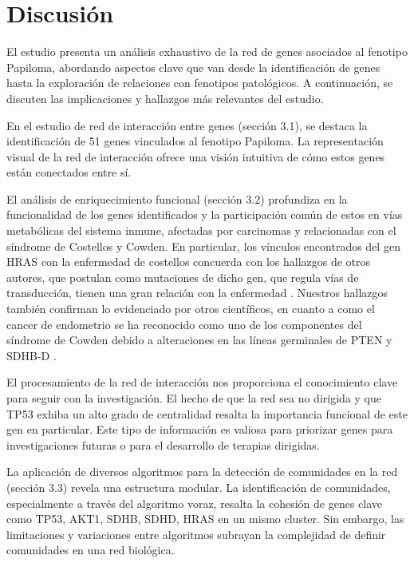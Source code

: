 \section{Discusión}

El estudio presenta un análisis exhaustivo de la red de genes asociados al fenotipo Papiloma, abordando aspectos clave que van desde la identificación de genes hasta la exploración de relaciones con fenotipos patológicos. A continuación, se discuten las implicaciones y hallazgos más relevantes del estudio.

\vspace{3pt}

En el estudio de red de interacción entre genes (sección 3.1), se destaca la identificación de 51 genes vinculados al fenotipo Papiloma. La representación visual de la red de interacción ofrece una visión intuitiva de cómo estos genes están conectados entre sí.

\vspace{3pt}

El análisis de enriquecimiento funcional (sección 3.2) profundiza en la funcionalidad de los genes identificados y la participación común de estos en vías metabólicas del sistema inmune, afectadas por carcinomas y relacionadas con el síndrome de Costellos y Cowden.  En particular, los vínculos encontrados del gen HRAS con la enfermedad de costellos concuerda con los hallazgos de otros autores, que postulan como mutaciones de dicho gen, que regula vías de transducción, tienen una gran relación con la enfermedad \cite{Siegel2012}.  Nuestros hallazgos también confirman lo evidenciado por otros científicos, en cuanto a como el cancer de endometrio se ha reconocido como uno de los componentes del síndrome de Cowden debido a alteraciones en las líneas germinales de PTEN y SDHB-D \cite{Mahdi2015}.

\vspace{3pt}

El procesamiento de la red de interacción nos proporciona el conocimiento clave para seguir con la investigación. El hecho de que la red sea no dirigida y que TP53 exhiba un alto grado de centralidad resalta la importancia funcional de este gen en particular. Este tipo de información es valiosa para priorizar genes para investigaciones futuras o para el desarrollo de terapias dirigidas.

\vspace{3pt}

La aplicación de diversos algoritmos para la detección de comunidades en la red (sección 3.3) revela una estructura modular. La identificación de comunidades, especialmente a través del algoritmo voraz, resalta la cohesión de genes clave como TP53, AKT1, SDHB, SDHD, HRAS en un mismo cluster. Sin embargo, las limitaciones y variaciones entre algoritmos subrayan la complejidad de definir comunidades en una red biológica.

